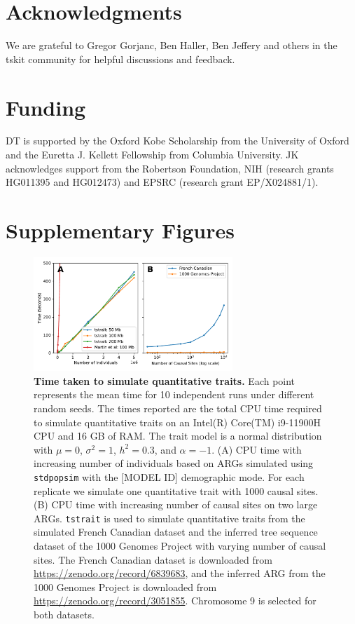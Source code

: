 \documentclass[unnumsec,webpdf,modern,large,namedate]{oup-authoring-template}%
\begin{document}
\section{Acknowledgments}
We are grateful to Gregor Gorjanc, Ben Haller, Ben Jeffery and
others in the tskit community for helpful discussions and feedback.

\section{Funding}
DT is supported by the Oxford Kobe Scholarship from the University of Oxford
and the Euretta J. Kellett Fellowship from Columbia University.
JK acknowledges support from the Robertson Foundation,
NIH (research grants HG011395 and HG012473) and
EPSRC (research grant EP/X024881/1).





\clearpage

\renewcommand\thefigure{S\arabic{figure}}
\setcounter{figure}{0}
\renewcommand\thetable{S\arabic{table}}
\setcounter{table}{0}
\section{Supplementary Figures}

\begin{figure}[t]%
\centering
\includegraphics[width=213pt]{figures/time-scaling.pdf}
\caption{\textbf{Time taken to simulate quantitative traits.} Each point
represents the mean time for 10 independent runs under different random seeds.
The times reported are the total CPU time required to simulate quantitative
traits on an Intel(R) Core(TM) i9-11900H CPU and 16 GB of RAM. The trait model
is a normal distribution with $\mu=0$, $\sigma^2=1$, $h^2=0.3$, and
$\alpha=-1$. (A) CPU time with increasing number of individuals
based on ARGs simulated using \texttt{stdpopsim} with the [MODEL ID]
demographic mode. For each replicate we simulate
one quantitative trait with 1000 causal sites.
(B) CPU time with increasing number of causal sites on two large ARGs.
\texttt{tstrait} is used to simulate quantitative traits from
the simulated French Canadian dataset \citep{anderson2023} and the inferred
tree sequence dataset of the 1000 Genomes Project \citep{kelleher2019} with
varying number of causal sites. The French Canadian dataset is downloaded from
\url{https://zenodo.org/record/6839683}, and the inferred ARG from the 1000
Genomes Project is downloaded from \url{https://zenodo.org/record/3051855}.
Chromosome 9 is selected for both datasets.}\label{fig:time}
\end{figure}
\end{document}
